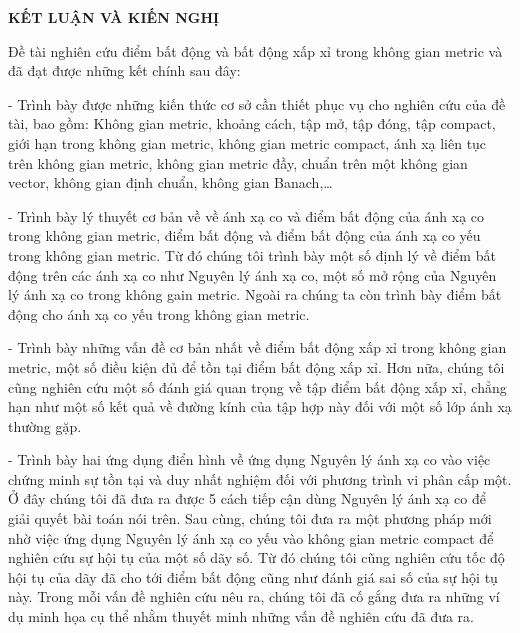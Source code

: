 \newpage
{}
\begin{center}
\textbf{ KẾT LUẬN VÀ KIẾN NGHỊ}
\end{center}



Đề tài nghiên cứu điểm bất động và bất động xấp xỉ trong không gian metric và đã đạt được những kết chính sau đây:

- Trình bày được những kiến thức cơ sở cần thiết phục vụ cho nghiên cứu của đề tài, bao gồm: Không gian metric, khoảng cách, tập mở, tập đóng, tập compact, giới hạn trong không gian metric, không gian metric compact, ánh xạ liên tục trên không gian metric, không gian metric đầy, chuẩn trên một không gian vector, không gian định chuẩn, không gian Banach,\ldots

- Trình bày lý thuyết cơ bản về về ánh xạ co và điểm bất động của ánh xạ co trong không gian metric, điểm bất động và điểm bất động của ánh xạ co yếu trong không gian metric. Từ đó chúng tôi trình bày một số định lý về điểm bất động trên các ánh xạ co như Nguyên lý ánh xạ co, một số mở rộng của Nguyên lý ánh xạ co trong không gain metric. Ngoài ra chúng ta còn trình bày điểm bất động cho ánh xạ co yếu trong không gian metric. 

- Trình bày những vấn đề cơ bản nhất về điểm bất động xấp xỉ trong không gian metric, một số điều kiện đủ để tồn tại điểm bất động xấp xỉ. Hơn nữa, chúng tôi cũng nghiên cứu một số đánh giá quan trọng về tập điểm bất động xấp xỉ, chẳng hạn như một số kết quả về đường kính của tập hợp này đối với một số lớp ánh xạ thường gặp.

- Trình bày hai ứng dụng điển hình về ứng dụng Nguyên lý ánh xạ co vào việc chứng minh sự tồn tại và duy nhất nghiệm đối với phương trình vi phân cấp một. Ở đây chúng tôi đã đưa ra được 5 cách tiếp cận dùng Nguyên lý ánh xạ co để giải quyết bài toán nói trên. Sau cùng, chúng tôi đưa ra một phương pháp mới nhờ việc ứng dụng Nguyên lý ánh xạ co yếu vào không gian metric compact để nghiên cứu sự hội tụ của một số dãy số. Từ đó chúng tôi cũng nghiên cứu tốc độ hội tụ của dãy đã cho tới điểm bất động cũng như đánh giá sai số của sự hội tụ này. Trong mỗi vấn đề nghiên cứu nêu ra, chúng tôi đã cố gắng đưa ra những ví dụ minh họa cụ thể nhằm thuyết minh những vấn đề nghiên cứu đã đưa ra.

